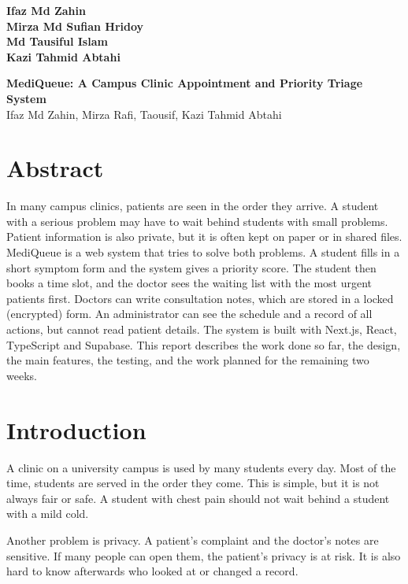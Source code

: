 \documentclass[12pt,a4paper]{article}
\begin{document}
\begin{flushright}
\textbf{Ifaz Md Zahin }\\
\textbf{Mirza Md Sufian Hridoy }\\
\textbf{Md Tausiful Islam }\\
\textbf{Kazi Tahmid Abtahi }
\end{flushright}
\newpage

\begin{center}
{\LARGE\bfseries MediQueue: A Campus Clinic Appointment and Priority Triage System}\\[8pt]
Ifaz Md Zahin, Mirza Rafi, Taousif, Kazi Tahmid Abtahi
\end{center}

\section*{Abstract}
In many campus clinics, patients are seen in the order they arrive. A student with a serious problem may have to wait behind students with small problems. Patient information is also private, but it is often kept on paper or in shared files. MediQueue is a web system that tries to solve both problems. A student fills in a short symptom form and the system gives a priority score. The student then books a time slot, and the doctor sees the waiting list with the most urgent patients first. Doctors can write consultation notes, which are stored in a locked (encrypted) form. An administrator can see the schedule and a record of all actions, but cannot read patient details. The system is built with Next.js, React, TypeScript and Supabase. This report describes the work done so far, the design, the main features, the testing, and the work planned for the remaining two weeks.

\newpage
\tableofcontents
\newpage

\section{Introduction}
A clinic on a university campus is used by many students every day. Most of the time, students are served in the order they come. This is simple, but it is not always fair or safe. A student with chest pain should not wait behind a student with a mild cold.

Another problem is privacy. A patient's complaint and the doctor's notes are sensitive. If many people can open them, the patient's privacy is at risk. It is also hard to know afterwards who looked at or changed a record.
\end{document}
